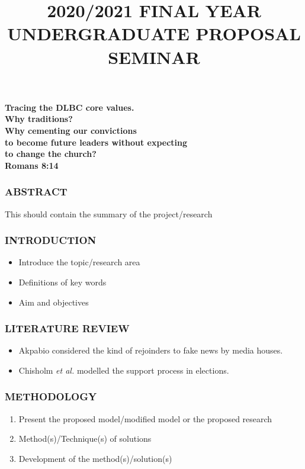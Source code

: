 \documentclass[20pt]{beamer}
\date{}
\title{\textbf{2020/2021 FINAL YEAR UNDERGRADUATE PROPOSAL SEMINAR}}
\begin{document}
	\begin{frame}
		\titlepage
		\color{blue}
		\begin{center}
			{{\textbf{Tracing the DLBC core values.}}\\}
			{{\textbf{Why traditions?}}\\}
			{{\textbf{Why cementing our convictions \\to become future leaders without expecting \\to change the church?}}\\}
			{{\textbf{Romans 8:14}}\\}
		\end{center}
	\end{frame}

\begin{frame}
	\frametitle{\textbf{ABSTRACT}}
	\color{blue}
	\begin{center}
	This should contain the summary of the project/research
	\end{center}
\end{frame}
	
	\begin{frame}
		\frametitle{\textbf{INTRODUCTION}}
		\color{blue}
\begin{itemize}
	\item Introduce the topic/research area
	\item Definitions of key words
	\item Aim and objectives 
\end{itemize}
	\end{frame}
	
	\begin{frame}
	\frametitle{\textbf{LITERATURE REVIEW}}
	\color{blue}
\begin{itemize}
	\item Akpabio\cite{Akpabio2004} considered the kind of rejoinders to fake news by media houses.
	\item Chisholm {\it et al.}\cite{Chisholm_etal_2018} modelled the support process in elections.
\end{itemize}
\end{frame}

	\begin{frame}
	\frametitle{\textbf{METHODOLOGY}}
	\color{blue}
	\begin{center}
\begin{enumerate}
	\item Present the proposed model/modified model or the proposed research
	\item Method(s)/Technique(s) of solutions
	\item Development of the method(s)/solution(s)
\end{enumerate}	\end{center}
\end{frame}
\end{document}

